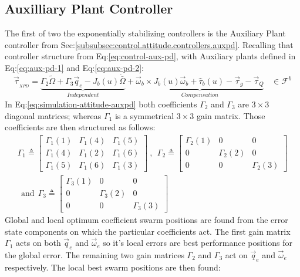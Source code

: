 \subsection{Auxilliary Plant Controller}
\label{subsec:simulation.attitude.xpd}
The first of two the exponentially stabilizing controllers is the Auxiliary Plant controller from Sec:\ref{subsubsec:control.attitude.controllers.auxpd}. Recalling that controller structure from Eq:\ref{eq:control-aux-pd}, with Auxiliary plants defined in Eq:\ref{eq:aux-pd-1} and Eq:\ref{eq:aux-pd-2}:
\begin{equation}\label{eq:simulation-attitude-auxpd}
\vec{\tau}_{_{XPD}}=\underbrace{\Gamma_2{\widetilde{\Omega}}+\Gamma_3\vec{q}_e-J_b(u)\dot{\bar{\Omega}}}_{Independent}+\underbrace{\vec{\omega}_b\times J_b(u)\vec{\omega}_b+\hat{\tau}_b(u)-\vec{\tau}_g-\vec{\tau}_Q}_{Compensation}~~~~\in\mathcal{F}^{b}
\end{equation}
In Eq:\ref{eq:simulation-attitude-auxpd} both coefficients $\Gamma_2$ and $\Gamma_3$ are $3\times 3$ diagonal matrices; whereas $\Gamma_1$ is a symmetrical $3\times 3$ gain matrix. Those coefficients are then structured as follows:
\begin{multline}\label{eq:simulation-attitde-auxpd-coefficients}
\Gamma_1\triangleq \begin{bmatrix}
\Gamma_1(1) & \Gamma_1(4) & \Gamma_1(5)\\
\Gamma_1(4) & \Gamma_1(2) & \Gamma_1(6)\\
\Gamma_1(5) & \Gamma_1(6) & \Gamma_1(3)
\end{bmatrix}~,~~
\Gamma_2\triangleq \begin{bmatrix}
\Gamma_2(1) & 0 & 0\\
0 &\Gamma_2(2) & 0\\
0 & 0 & \Gamma_2(3)
\end{bmatrix}
\\
~~\text{and}~~\Gamma_3\triangleq \begin{bmatrix}
\Gamma_3(1) & 0 & 0\\
0 & \Gamma_3(2) & 0\\
0 & 0 & \Gamma_3(3)
\end{bmatrix}
\end{multline}
Global and local optimum coefficient swarm positions are found from the error state components on which the particular coefficients act. The first gain matrix $\Gamma_1$ acts on both $\vec{q}_e$ and $\vec{\omega}_e$ so it's local errors are best performance positions for the global error. The remaining two gain matrices $\Gamma_2$ and $\Gamma_3$ act on $\vec{q}_e$ and $\vec{\omega}_e$ respectively. The local best swarm positions are then found:
